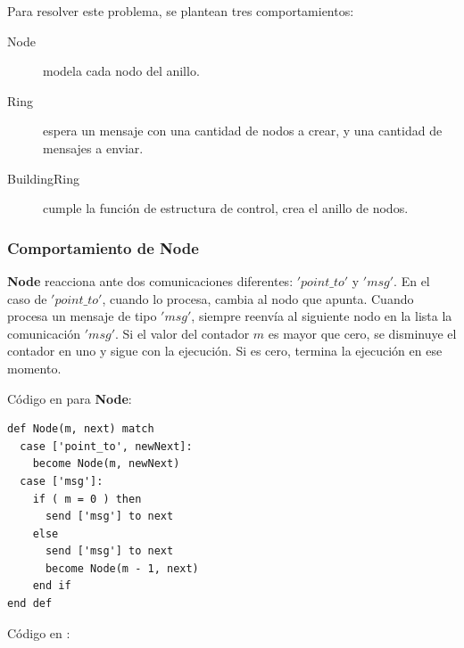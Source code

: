 Para resolver este problema, se plantean tres comportamientos:

\begin{description}
 \item [Node] modela cada nodo del anillo.
 \item [Ring] espera un mensaje con una cantidad de nodos a crear, y una cantidad de mensajes a enviar.
 \item [BuildingRing] cumple la función de estructura de control, crea el anillo de nodos.
\end{description}

\subsubsection*{Comportamiento de Node}

\textbf{Node} reacciona ante dos comunicaciones diferentes: $'point\_to'$ y $'msg'$. En el caso de $'point\_to'$, cuando lo procesa, cambia al nodo que apunta. Cuando procesa un mensaje de tipo $'msg'$, siempre reenvía al siguiente nodo en la lista la comunicación $'msg'$. Si el valor del contador $m$ es mayor que cero, se disminuye el contador en uno y sigue con la ejecución. Si es cero, termina la ejecución en ese momento.

Código en \SAL para \textbf{Node}:

\begin{lstlisting}[language=sal, style=simple]
def Node(m, next) match
  case ['point_to', newNext]:
    become Node(m, newNext)
  case ['msg']:
    if ( m = 0 ) then
      send ['msg'] to next
    else
      send ['msg'] to next
      become Node(m - 1, next)
    end if
end def
\end{lstlisting}

Código en \CSP:

